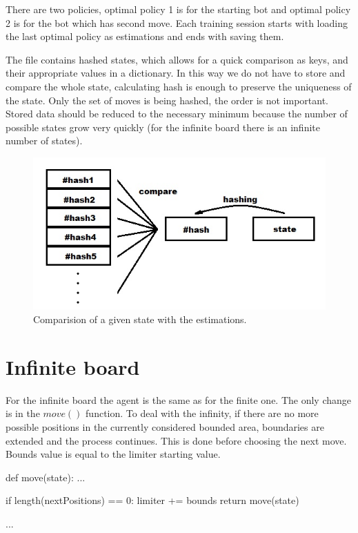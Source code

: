 \documentclass[a4paper,12pt]{book}
\begin{document}
There are two policies, optimal policy 1 is for the starting bot and optimal policy 2 is for the bot which has second move. Each training session starts with loading the last optimal policy as estimations and ends with saving them. 

The file contains hashed states, which allows for a quick comparison as keys, and their appropriate values in a dictionary. In this way we do not have to store and compare the whole state, calculating hash is enough to preserve the uniqueness of the state. Only the set of moves is being hashed, the order is not important. Stored data should be reduced to the necessary minimum because the number of possible states grow very quickly (for the infinite board there is an infinite number of states).

\begin{figure}[!h]
\includegraphics{./Images/hashing.jpg}
	\centering
	\caption{Comparision of a given state with the estimations.}
	\label{fig:Capture1}
\end{figure}

	\section{Infinite board}

For the infinite board the agent is the same as for the finite one. The only change is in the $move()$ function. To deal with the infinity, if there are no more possible positions in the currently considered bounded area, boundaries are extended and the process continues. This is done before choosing the next move. Bounds value is equal to the limiter starting value.

\begin{python}
def move(state):
	...

	if length(nextPositions) == 0:
		limiter += bounds
		return move(state)

	...
\end{python}
\end{document}
